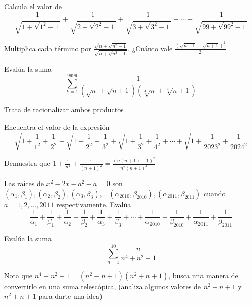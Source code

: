 \documentclass[11pt]{scrartcl}
\begin{document}
   \hspace{0.2cm}
    \begin{problem}
        Calcula el valor de
        \[\frac{1}{\sqrt{1+\sqrt{1^2-1}}}+\frac{1}{\sqrt{2+\sqrt{2^2-1}}}+\frac{1}{\sqrt{3+\sqrt{3^2-1}}}+\cdots+\frac{1}{\sqrt{99+\sqrt{99^2-1}}}\]
        \begin{hint}
            Multiplica cada término por $\frac{\sqrt{n+\sqrt{n^2-1}}}{\sqrt{n+\sqrt{n^2-1}}}$.  ¿Cuánto vale $\frac{(\sqrt{n-1}+\sqrt{n+1})^2}{2}$
        \end{hint}
    \end{problem} \hspace{0.2cm}
    \begin{problem}
        Evalúa la suma
        \[\sum_{k=1}^{9999}\frac{1}{\left(\sqrt{n}+\sqrt{n+1}\right)\left(\sqrt[4]{n}+\sqrt[4]{n+1}\right)}\]
        \begin{hint}
            Trata de racionalizar ambos productos
        \end{hint}
    \end{problem} \hspace{0.2cm}
   
    \begin{problem}
        Encuentra el valor de la expresión
        \[\sqrt{1+\frac{1}{1^2}+\frac{1}{2^2}
        }+\sqrt{1+\frac{1}{2^2}+\frac{1}{3^2}
        }+\sqrt{1+\frac{1}{3^2}+\frac{1}{4^2}
        }+\cdots+\sqrt{1+\frac{1}{2023^2}+\frac{1}{2024^2}
        }\]
        \begin{hint}
            Demuestra que $1+\frac{1}{n^2}+\frac{1}{(n+1)^2}=\frac{(n(n+1)+1)^2}{n^2(n+1)^2}$
        \end{hint}
    \end{problem}
    \hspace{0.2cm}
    \begin{problem}
        [\href{https://math.stackexchange.com/questions/3123586/question-from-the-2011-imc-international-mathematics-competition-key-stage-iii?noredirect=1}{2011 IMC}]
        Las raíces de $x^2-2x-a^2-a=0$ son $\left(\alpha_1,\beta_1\right), \left(\alpha_2,\beta_2\right), \left(\alpha_3,\beta_3\right),\ldots \left(\alpha_{2010},\beta_{2010}\right),  \left(\alpha_{2011},\beta_{2011}\right)$ cuando $a=1,2,\ldots, 2011$ respectivamente. Evalúa
        \[\frac{1}{\alpha_1}+\frac{1}{\beta_1}+\frac{1}{\alpha_2}+\frac{1}{\beta_2}+\frac{1}{\alpha_3}+\frac{1}{\beta_3}+\cdots+\frac{1}{\alpha_{2010}}+\frac{1}{\beta_{2010}}+\frac{1}{\alpha_{2011}}+\frac{1}{\beta_{2011}}\]
    \end{problem}
     \begin{problem}
        Evalúa la suma 
        \[\sum_{n=1}^{10}\frac{n}{n^4+n^2+1}\]
        \begin{hint}
            Nota que $n^4+n^2+1=(n^2-n+1)(n^2+n+1)$, busca una manera de convertirlo en una suma telescópica, (analiza algunos valores de $n^2-n+1$ y $n^2+n+1$ para darte una idea)
        \end{hint}
    \end{problem} \hspace{0.2cm}
\end{document}
